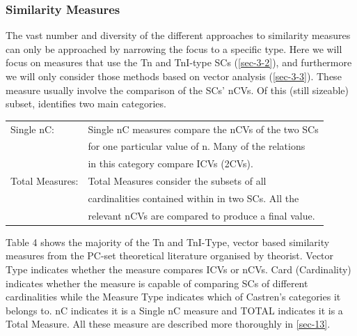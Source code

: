 \documentclass{article}
\begin{document}
\subsubsection{Similarity Measures}
\label{sec-3-4-2}

The vast number and diversity of the different approaches to
similarity measures can only be approached by narrowing the focus to a
specific type. Here we will focus on measures that use the Tn and
TnI-type SCs (\ref{sec-3-2}), and furthermore we will only
consider those methods based on vector analysis (\ref{sec-3-3}). These measure usually involve the comparison of the SCs'
nCVs. Of this (still sizeable) subset, \citet{Castren1994} identifies
two main categories.

\begin{center}
\begin{tabular}{ll}
 Single nC:       &  Single nC measures compare the nCVs of the two SCs    \\
                  &  for one particular value of n. Many of the relations  \\
                  &  in this category compare ICVs (2CVs).                 \\
 Total Measures:  &  Total Measures consider the subsets of all            \\
                  &  cardinalities contained within in two SCs. All the    \\
                  &  relevant nCVs are compared to produce a final value.  \\
\end{tabular}
\end{center}



Table 4 shows the majority of the Tn and TnI-Type, vector based
similarity measures from the PC-set theoretical literature organised
by theorist. Vector Type indicates whether the measure compares ICVs
or nCVs. Card (Cardinality) indicates whether the measure is capable
of comparing SCs of different cardinalities while the Measure Type
indicates which of Castren's categories it belongs to. nC indicates it
is a Single nC measure and TOTAL indicates it is a Total Measure. All
these measure are described more thoroughly in \ref{sec-13}.
\end{document}
